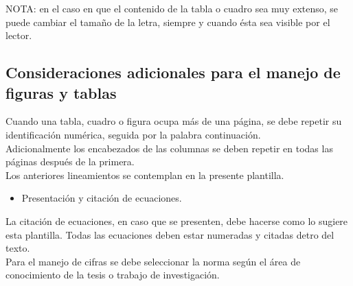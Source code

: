 NOTA: en el caso en que el contenido de la tabla o cuadro sea muy extenso, se puede cambiar el tama\~{n}o de la letra, siempre y cuando \'{e}sta sea visible por el lector.\\

\subsection{Consideraciones adicionales para el manejo de figuras y tablas}
Cuando una tabla, cuadro o figura ocupa m\'{a}s de una p\'{a}gina, se debe repetir su identificaci\'{o}n num\'{e}rica, seguida por la palabra continuaci\'{o}n.\\

Adicionalmente los encabezados de las columnas se deben repetir en todas las p\'{a}ginas despu\'{e}s de la primera.\\

Los anteriores lineamientos se contemplan en la presente plantilla.\\

\begin{itemize}
\item Presentaci\'{o}n y citaci\'{o}n de ecuaciones.
\end{itemize}

La citaci\'{o}n de ecuaciones, en caso que se presenten, debe hacerse como lo sugiere esta plantilla. Todas las ecuaciones deben estar numeradas y citadas detro del texto.\\

Para el manejo de cifras se debe seleccionar la norma seg\'{u}n el \'{a}rea de conocimiento de la tesis  o trabajo de investigaci\'{o}n.\\